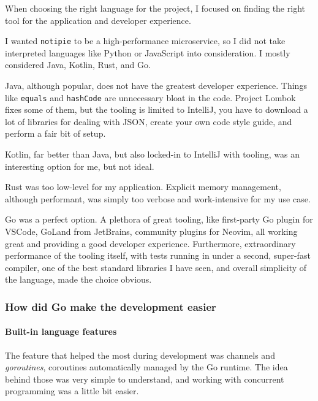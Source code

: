 When choosing the right language for the project, I focused on finding
the right tool for the application and developer experience.

I wanted \texttt{notipie} to be a high-performance microservice, so I
did not take interpreted languages like Python or JavaScript into
consideration. I mostly considered Java, Kotlin, Rust, and Go.

Java, although popular, does not have the greatest developer experience.
Things like \texttt{equals} and \texttt{hashCode} are unnecessary bloat
in the code. Project Lombok fixes some of them, but the tooling is
limited to IntelliJ, you have to download a lot of libraries for dealing
with JSON, create your own code style guide, and perform a fair bit of
setup.

Kotlin, far better than Java, but also locked-in to IntelliJ with
tooling, was an interesting option for me, but not ideal.

Rust was too low-level for my application. Explicit memory management,
although performant, was simply too verbose and work-intensive for my
use case.

Go was a perfect option. A plethora of great tooling, like first-party
Go plugin for VSCode, GoLand from JetBrains, community plugins for
Neovim, all working great and providing a good developer experience.
Furthermore, extraordinary performance of the tooling itself, with tests
running in under a second, super-fast compiler, one of the best standard
libraries I have seen, and overall simplicity of the language, made the
choice obvious.

\hypertarget{how-did-go-make-the-development-easier}{%
\subsubsection{How did Go make the development
easier}\label{how-did-go-make-the-development-easier}}

\hypertarget{built-in-language-features}{%
\paragraph{Built-in language
features}\label{built-in-language-features}}

The feature that helped the most during development was channels and
\emph{goroutines}, coroutines automatically managed by the Go runtime.
The idea behind those was very simple to understand, and working with
concurrent programming was a little bit easier.

